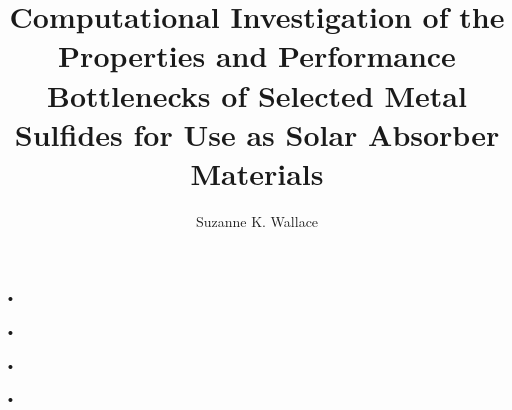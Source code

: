 \documentclass[a4paper,12pt,twoside]{report}
\begin{document}
\title{\LARGE {\bf Computational Investigation of the Properties and Performance Bottlenecks of Selected Metal Sulfides for Use as Solar Absorber Materials}\\
 \vspace*{6mm}
}

\author{Suzanne K. Wallace}
\submitdate{\today}

\normallinespacing
\begin{footnotesize}
{\scriptsize •\begin{tiny}
•
\end{tiny}}
\end{footnotesize}\maketitle
\begin{scriptsize}
{\footnotesize •\begin{small}
•
\end{small}}
\end{scriptsize}
\preface


%
%

\body








\appendix




\end{document}
